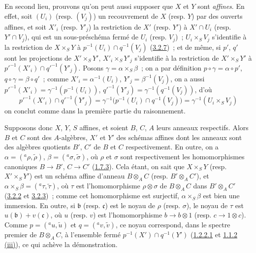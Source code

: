 En second lieu, prouvons qu'on peut aussi supposer que $X$ et $Y$ sont
\emph{affines}. En effet, soit $(U_i)$ (resp. $(V_j)$) un recouvrement de $X$
(resp. $Y$) par des ouverts affines, et soit $X'_i$ (resp. $Y'_j$) la
restriction de $X'$ (resp. $Y'$) à $X'\cap U_i$ (resp. $Y'\cap V_j$), qui est
un sous-préschéma fermé de $U_i$ (resp. $V_j$)~; $U_i\times_S V_j$ s'identifie
à la restriction de $X\times_S Y$ à
$p^{-1}(U_i)\cap q^{-1}(V_j)$ (\hyperref[I.3.2.7-fr]{3.2.7})~; et de même, si
$p'$, $q'$ sont les projections de $X'\times_S Y'$,
$X'_i\times_S Y'_j$ s'identifie à la restriction de $X'\times_S Y'$ à
${p'}^{-1}(X'_i)\cap{q'}^{-1}(Y'_j)$. Posons
$\gamma=\alpha\times_S\beta$~; on a par définition
$p\circ\gamma=\alpha\circ p'$, $q\circ\gamma=\beta\circ q'$~; comme
$X'_i=\alpha^{-1}(U_i)$, $Y'_j=\beta^{-1}(V_j)$, on a aussi
${p'}^{-1}(X'_i)=\gamma^{-1}(p^{-1}(U_i))$,
${q'}^{-1}(Y'_j)=\gamma^{-1}(q^{-1}(V_j))$, d'où
\[
  {p'}^{-1}(X'_i)\cap{q'}^{-1}(Y'_j)
  =\gamma^{-1}\bigl(p^{-1}(U_i)\cap q^{-1}(V_j)\bigr)
  =\gamma^{-1}(U_i\times_S V_j)
\]
on conclut comme dans la première partie du raisonnement.

Supposons donc $X$, $Y$, $S$ affines, et soient $B$, $C$, $A$ leurs anneaux
respectifs. Alors $B$ et $C$ sont des $A$-algèbres, $X'$ et $Y'$ des schémas
affines dont les anneaux sont des algèbres quotients $B'$, $C'$ de $B$ et
$C$ respectivement. En outre, on a
$\alpha=({}^a\rho,\widetilde{\rho})$, $\beta=({}^a\sigma,\widetilde{\sigma})$,
où $\rho$ et $\sigma$ sont respectivement les homomorphismes canoniques
$B\to B'$, $C\to C'$ (\hyperref[I.1.7.3-fr]{1.7.3}). Cela étant, on sait que
$X\times_S Y$ (resp. $X'\times_S Y'$) est un schéma affine d'anneau
$B\otimes_A C$ (resp. $B'\otimes_A C'$), et
$\alpha\times_S\beta=({}^a\tau,\widetilde{\tau})$, où $\tau$ est
l'homomorphisme $\rho\otimes\sigma$ de $B\otimes_A C$ dans
$B'\otimes_A C'$ (\hyperref[I.3.2.2-fr]{3.2.2} et
\hyperref[I.3.2.3-fr]{3.2.3})~; comme cet homomorphisme est surjectif,
$\alpha\times_S\beta$ est bien une immersion. En outre, si $\mathfrak{b}$
(resp. $\mathfrak{c}$) est le noyau de $\rho$ (resp. $\sigma$), le noyau de
$\tau$ est $u(\mathfrak{b})+v(\mathfrak{c})$, où $u$ (resp. $v$) est
l'homomorphisme $b\to b\otimes1$ (resp. $c\to1\otimes c$). Comme
$p=({}^a u,\widetilde{u})$ et $q=({}^a v,\widetilde{v})$, ce noyau correspond,
dans le spectre premier de $B\otimes_A C$, à l'ensemble fermé
$p^{-1}(X')\cap q^{-1}(Y')$ (\hyperref[I.1.2.2.1-fr]{1.2.2.1} et
\hyperref[I.1.1.2-fr]{1.1.2 (iii)}), ce qui achève la démonstration.

